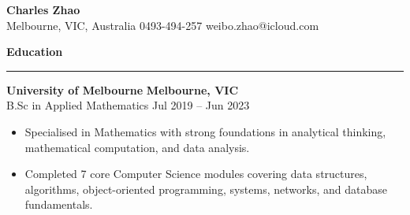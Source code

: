 \documentclass[11pt, letterpaper]{article}
\newcommand{\cvsection}[1]{
	\vspace{0.5em}
	\noindent\textbf{#1}\\[-0.5em] 
	\rule{\textwidth}{0.5pt}
	\vspace{0.5em}
}
\begin{document}
\begin{center}
\textbf{Charles Zhao} \\
\vspace{0.2em}
\scriptsize Melbourne, VIC, Australia \vline \hspace{0.1em} 0493-494-257 \vline \hspace{0.1em} weibo.zhao@icloud.com
\end{center}


\cvsection{Education}
\scriptsize \textbf{University of Melbourne} \hfill \textbf{Melbourne, VIC} \\[-0.6em]
\scriptsize {B.Sc in Applied Mathematics} \hfill Jul 2019 -- Jun 2023
\vspace{-0.5em}
\begin{itemize}
    \setlength\itemsep{-0.2em}
    \setlength\leftskip{-2em}
    \setlength{}
    \setlength\itemindent{0em}    
    \item Specialised in Mathematics with strong foundations in analytical thinking, mathematical computation, and data analysis.
    \item Completed 7 core Computer Science modules covering data structures, algorithms, object-oriented programming, systems, networks, and database fundamentals.
\end{itemize}
\vspace{-0.4em}
\end{document}
